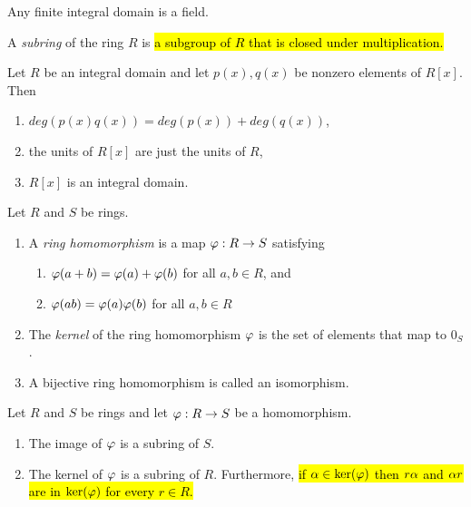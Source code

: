 \nl

\begin{cor}
Any finite integral domain is a field.
\end{cor}

\nl

\begin{defn}
A \textit{subring} of the ring $R$ is \hl{a subgroup of $R$ that is closed under multiplication.}
\end{defn}

\nl

\begin{prop}
Let $R$ be an integral domain and let $p(x), q(x)$ be nonzero elements of $R[x]$. Then
\begin{enumerate}
\item $deg(p(x)q(x)) = deg (p(x)) + deg(q(x))$,
\item the units of $R[x]$ are just the units of $R$,
\item $R[x]$ is an integral domain.
\end{enumerate}
\end{prop}

\nl

\begin{defn}
Let $R$ and $S$ be rings.
\begin{enumerate}
\item A \textit{ring homomorphism} is a map $\varphi: R\rightarrow S$ satisfying
\begin{enumerate}
\item $\varphi(a+b) = \varphi(a)+\varphi(b)$ for all $a,b\in R$, and 
\item $\varphi(ab) = \varphi(a)\varphi(b)$ for all $a,b\in R$
\end{enumerate}
\item The \textit{kernel} of the ring homomorphism $\varphi$ is the set of elements that map to $0_S$.
\item A bijective ring homomorphism is called an isomorphism.
\end{enumerate}
\end{defn}

\nl

\begin{prop}
Let $R$ and $S$ be rings and let $\varphi:R\rightarrow S$ be a homomorphism.
\begin{enumerate}
\item The image of $\varphi$ is a subring of $S$.
\item The kernel of $\varphi$ is a subring of $R$. Furthermore, \hl{if $\alpha\in\ker(\varphi)$ then $r\alpha$ and $\alpha r$ are in $\ker(\varphi)$ for every $r\in R$.}
\end{enumerate}
\end{prop}


